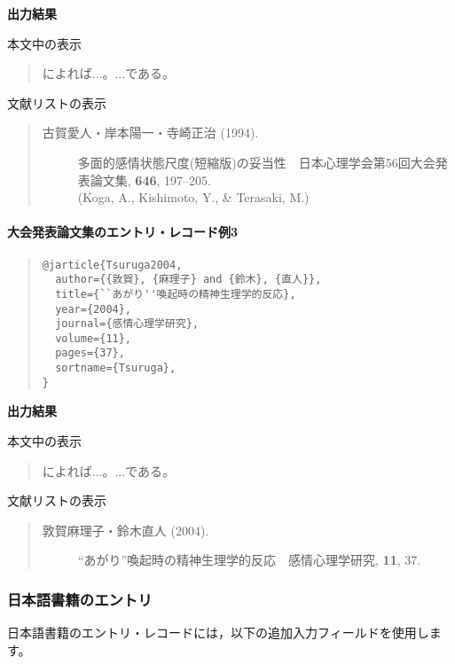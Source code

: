 \documentclass[12pt]{ltjsarticle}
\begin{document}
\textbf{出力結果}

本文中の表示
\begin{quote}
\textcite{Koga1992}によれば...。...である\parencite{Koga1992}。
\end{quote}


文献リストの表示
\begin{quote}
\begin{description}
  \item[\textrm{古賀愛人・岸本陽一・寺崎正治 (1994).}]多面的感情状態尺度(短縮版)の妥当性　日本心理学会第56回大会発表論文集, \textbf{646}, 197--205.\\
(Koga, A., Kishimoto, Y., \& Terasaki, M.)
\end{description}
\end{quote}

\paragraph{大会発表論文集のエントリ・レコード例3}

\begin{quote}
\begin{verbatim}
@jarticle{Tsuruga2004,
  author={{敦賀}, {麻理子} and {鈴木}, {直人}},
  title={``あがり''喚起時の精神生理学的反応},
  year={2004},
  journal={感情心理学研究},
  volume={11},
  pages={37},
  sortname={Tsuruga},
}
\end{verbatim}
\end{quote}


\textbf{出力結果}

本文中の表示
\begin{quote}
\textcite{Kugihara2003}によれば...。...である\parencite{Kugihara2003}。
\end{quote}


文献リストの表示
\begin{quote}
\begin{description}
  \item[\textrm{敦賀麻理子・鈴木直人 (2004).}]``あがり''喚起時の精神生理学的反応　感情心理学研究, \textbf{11}, 37.
\end{description}
\end{quote}

\subsubsection{日本語書籍のエントリ}

日本語書籍のエントリ・レコードには，以下の追加入力フィールドを使用します。
\end{document}
